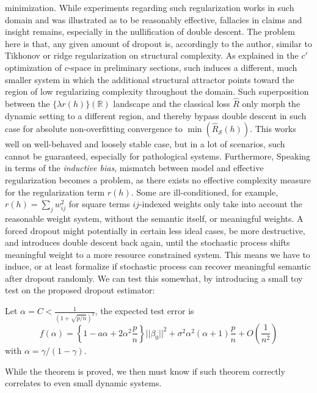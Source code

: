 \documentclass[10pt]{article} %
\begin{document}
minimization. While experiments regarding such regularization works in such domain and was illustrated as to be reasonably effective, fallacies in claims and insight remains, especially in the nullification of double descent. The problem here is that, any given amount of dropout is, accordingly to the author, similar to Tikhonov or ridge regularization on structural complexity. As explained in the $c'$ optimization of $c$-space in preliminary sections, such induces a different, much smaller system in which the additional structural attractor points toward the region of low regularizing complexity throughout the domain. Such superposition between the $\{\lambda r(h)\}(\mathbb{R})$ landscape and the classical loss $\hat{R}$ only morph the dynamic setting to a different region, and thereby bypass double descent in such case for absolute non-overfitting convergence to $\min{(\hat{R}_{\mathcal{S}}(h))}$. This works well on well-behaved and loosely stable case, but in a lot of scenarios, such cannot be guaranteed, especially for pathological systems. Furthermore, Speaking in terms of the \textit{inductive bias}, mismatch between model and effective regularization becomes a problem, as there exists no effective complexity measure for the regularization term $r(h)$. Some are ill-conditioned, for example, $r(h)=\sum_{j}w_{ij}^{2}$ for square terms $ij$-indexed weights only take into account the reasonable weight system, without the semantic itself, or meaningful weights. A forced dropout might potentially in certain less ideal cases, be more destructive, and introduces double descent back again, until the stochastic process shifts meaningful weight to a more resource constrained system. This means we have to induce, or at least formalize if stochastic process can recover meaningful semantic after dropout randomly. We can test this somewhat, by introducing a small toy test on the proposed dropout estimator: 
\begin{theorem}
    Let $\alpha = C< \frac{1}{(1+\sqrt{p/n})^2}$, the expected test error is \begin{equation}
        f(\alpha) = \left\{ 1- a\alpha + 2\alpha^2 \frac{p}{n} \right\} ||\beta_{0}||^2 + \sigma^2 \alpha^2 (\alpha + 1)\frac{p}{n} + O\left(\frac{1}{n^2}\right)
    \end{equation}
    with $\alpha=\gamma/(1-\gamma)$.
\end{theorem}
While the theorem is proved, we then must know if such theorem correctly correlates to even small dynamic systems. 
\clearpage
\end{document}
